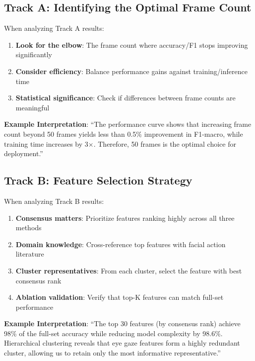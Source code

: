 \documentclass[11pt,a4paper]{article}
\begin{document}
\subsection{Track A: Identifying the Optimal Frame Count}

When analyzing Track A results:

\begin{enumerate}
  \item \textbf{Look for the elbow}: The frame count where accuracy/F1 stops improving significantly
  \item \textbf{Consider efficiency}: Balance performance gains against training/inference time
  \item \textbf{Statistical significance}: Check if differences between frame counts are meaningful
\end{enumerate}

\textbf{Example Interpretation}: ``The performance curve shows that increasing frame count beyond 50 frames yields less than 0.5\% improvement in F1-macro, while training time increases by 3$\times$. Therefore, 50 frames is the optimal choice for deployment.''

\subsection{Track B: Feature Selection Strategy}

When analyzing Track B results:

\begin{enumerate}
  \item \textbf{Consensus matters}: Prioritize features ranking highly across all three methods
  \item \textbf{Domain knowledge}: Cross-reference top features with facial action literature
  \item \textbf{Cluster representatives}: From each cluster, select the feature with best consensus rank
  \item \textbf{Ablation validation}: Verify that top-K features can match full-set performance
\end{enumerate}

\textbf{Example Interpretation}: ``The top 30 features (by consensus rank) achieve 98\% of the full-set accuracy while reducing model complexity by 98.6\%. Hierarchical clustering reveals that eye gaze features form a highly redundant cluster, allowing us to retain only the most informative representative.''
\end{document}
